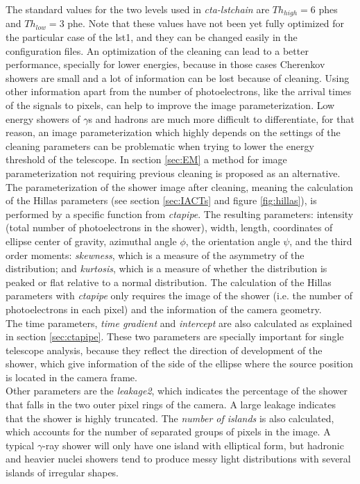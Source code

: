 \documentclass[main.tex]{subfiles}
\begin{document}
   The standard values for the two levels used in \textit{cta-lstchain} are $Th_{high} = 6$ phes and $Th_{low} = 3$ phe. Note that these values have not been yet fully optimized for the particular case of the \gls{lst}1, and they can be changed easily in the configuration files. An optimization of the cleaning can lead to a better performance, specially for lower energies, because in those cases Cherenkov showers are small and a lot of information can be lost because of cleaning. Using other information apart from the number of photoelectrons, like the arrival times of the signals to pixels, can help to improve the image parameterization. Low energy showers of $\gamma$s and hadrons are much more difficult to differentiate, for that reason, an image parameterization which highly depends on the settings of the cleaning parameters can be problematic when trying to lower the energy threshold of the telescope. In section \ref{sec:EM} a method for image parameterization not requiring previous cleaning is proposed as an alternative.\\
   The parameterization of the shower image after cleaning, meaning the calculation of the Hillas parameters (see section \ref{sec:IACTs} and figure \ref{fig:hillas}), is performed by a specific function from \textit{ctapipe}. The resulting parameters: intensity (total number of photoelectrons in the shower), width, length, coordinates of ellipse center of gravity, azimuthal angle $\phi$, the orientation angle $\psi$, and the third order moments: \textit{skewness}, which is a measure of the asymmetry of the distribution; and \textit{kurtosis}, which is a measure of whether the distribution is peaked or flat relative to a normal distribution. The calculation of the Hillas parameters with \textit{ctapipe} only requires the image of the shower (i.e. the number of photoelectrons in each pixel) and the information of the camera geometry.\\
   The time parameters, \textit{time gradient} and \textit{intercept} are also calculated as explained in section \ref{sec:ctapipe}. These two parameters are specially important for single telescope analysis, because they reflect the direction of development of the shower, which give information of the side of the ellipse where the source position is located in the camera frame.\\
   Other parameters are the \textit{leakage2}, which indicates the percentage of the shower that falls in the two outer pixel rings of the camera. A large leakage indicates that the shower is highly truncated. The \textit{number of islands} is also calculated, which accounts for the number of separated groups of pixels in the image. A typical $\gamma$-ray shower will only have one island with elliptical form, but hadronic and heavier nuclei showers tend to produce messy light distributions with several islands of irregular shapes.\\
   
\end{document}
